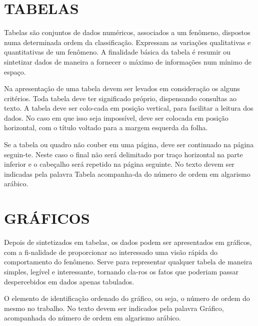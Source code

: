 

\section{TABELAS}

Tabelas são conjuntos de dados numéricos, associados a um
fenômeno, dispostos numa determinada ordem da classificação. Expressam as variações qualitativas e quantitativas de um fenômeno. A finalidade básica da tabela é resumir ou sintetizar dados de maneira a fornecer o máximo de informações num mínimo de espaço.

Na apresentação de uma tabela devem ser levados em consideração
os alguns critérios. Toda tabela deve ter significado próprio, dispensando consultas ao texto. A tabela deve ser colo-cada em posição vertical, para facilitar a leitura dos dados. No caso em que isso seja impossível, deve ser colocada em posição horizontal, com o título voltado para a margem esquerda da folha.

Se a tabela ou quadro não couber em uma página, deve ser
continuado na página seguin-te. Neste caso o final não será delimitado por traço horizontal na parte inferior e o cabeçalho será repetido na página seguinte. No texto devem ser indicadas pela palavra Tabela acompanha-da do número de ordem em algarismo arábico.




\section{GRÁFICOS}

Depois de sintetizados em tabelas, os dados podem ser
apresentados em gráficos, com a fi-nalidade de proporcionar ao interessado uma visão rápida do comportamento do fenômeno. Serve para representar qualquer tabela de maneira simples, legível e interessante, tornando cla-ros os fatos que poderiam passar despercebidos em dados apenas tabulados.

O elemento de identificação ordenado do gráfico, ou seja, o
número de ordem do mesmo no trabalho. No texto devem ser indicados pela palavra Gráfico, acompanhada do número de ordem em algarismo arábico.



